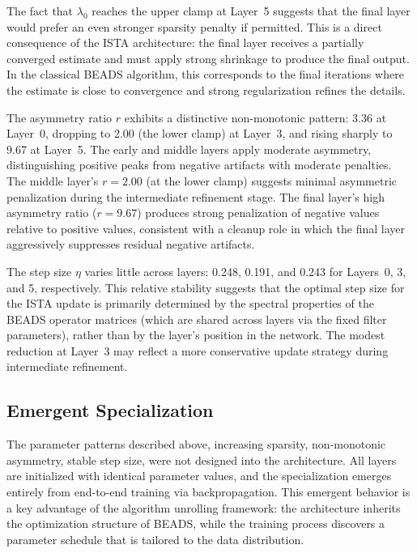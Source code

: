The fact that $\lambda_0$ reaches the upper clamp at Layer~5 suggests that the final layer would prefer an even stronger sparsity penalty if permitted. This is a direct consequence of the ISTA architecture: the final layer receives a partially converged estimate and must apply strong shrinkage to produce the final output. In the classical BEADS algorithm, this corresponds to the final iterations where the estimate is close to convergence and strong regularization refines the details.

The asymmetry ratio $r$ exhibits a distinctive non-monotonic pattern: 3.36 at Layer~0, dropping to 2.00 (the lower clamp) at Layer~3, and rising sharply to 9.67 at Layer~5. The early and middle layers apply moderate asymmetry, distinguishing positive peaks from negative artifacts with moderate penalties. The middle layer's $r = 2.00$ (at the lower clamp) suggests minimal asymmetric penalization during the intermediate refinement stage. The final layer's high asymmetry ratio ($r = 9.67$) produces strong penalization of negative values relative to positive values, consistent with a cleanup role in which the final layer aggressively suppresses residual negative artifacts.

The step size $\eta$ varies little across layers: 0.248, 0.191, and 0.243 for Layers~0, 3, and 5, respectively. This relative stability suggests that the optimal step size for the ISTA update is primarily determined by the spectral properties of the BEADS operator matrices (which are shared across layers via the fixed filter parameters), rather than by the layer's position in the network. The modest reduction at Layer~3 may reflect a more conservative update strategy during intermediate refinement.


\subsection{Emergent Specialization}
\label{sec:results_emergent}

The parameter patterns described above, increasing sparsity, non-monotonic asymmetry, stable step size, were not designed into the architecture. All layers are initialized with identical parameter values, and the specialization emerges entirely from end-to-end training via backpropagation. This emergent behavior is a key advantage of the algorithm unrolling framework: the architecture inherits the optimization structure of BEADS, while the training process discovers a parameter schedule that is tailored to the data distribution.

